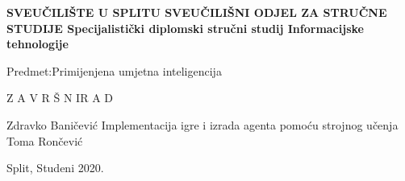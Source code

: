 %
%
\begin{titlepage}
	\bfseries
	\headerdata
	{SVEUČILIŠTE U SPLITU}
	{SVEUČILIŠNI ODJEL ZA STRUČNE STUDIJE}
	{Specijalistički diplomski stručni studij Informacijske tehnologije}
	
	\vspace*{5cm}
	\begin{flushleft}
		{\large   Predmet:\normalfont\space Primijenjena umjetna inteligencija}
	\end{flushleft}
	\vspace*{3cm}
	
	\begin{center}
		{\LARGE {Z A V R Š N I\space\space\space R A D}}
	\end{center}
	\vspace*{2cm}
	
	\thesisdata
	{Zdravko Baničević}
	{Implementacija igre i izrada agenta pomoću strojnog učenja}
	{Toma Rončević}
	
	\begin{center}
		\vfill
		{\large\normalfont Split, Studeni 2020.}
	\end{center}
\end{titlepage}
%
%